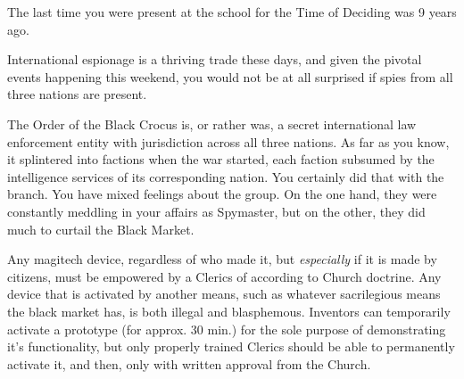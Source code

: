 \documentclass[char]{GL2020}
\begin{document}
\begin{itemz}[Notes]
	\item The last time you were present at the school for the Time of Deciding was 9 years ago.
	\item International espionage is a thriving trade these days, and given the pivotal events happening this weekend, you would not be at all surprised if spies from all three nations are present. 
	\item The Order of the Black Crocus is, or rather was, a secret international law enforcement entity with jurisdiction across all three nations. As far as you know, it splintered into factions when the war started, each faction subsumed by the intelligence services of its corresponding nation. You certainly did that with the \pTech{} branch. You have mixed feelings about the group. On the one hand, they were constantly meddling in your affairs as Spymaster, but on the other, they did much to curtail the Black Market.
	\item Any magitech device, regardless of who made it, but \emph{especially} if it is made by \pTech{} citizens, must be empowered by a Clerics of \cTechGod{} according to Church doctrine. Any device that is activated by another means, such as whatever sacrilegious means the black market has, is both illegal and blasphemous. Inventors can temporarily activate a prototype (for approx. 30 min.) for the sole purpose of demonstrating it's functionality, but only properly trained Clerics should be able to permanently activate it, and then, only with written approval from the Church.
\end{itemz}
\end{document}
